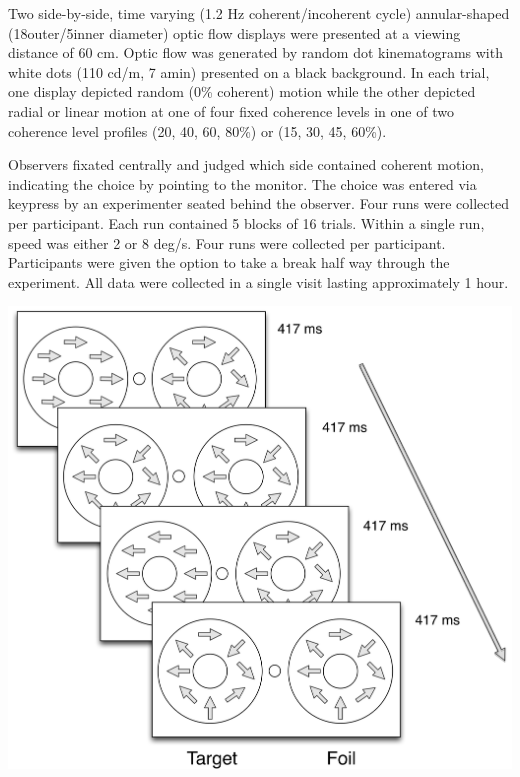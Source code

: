 \documentclass[landscape,final,paperwidth=60in,paperheight=39in,fontscale=0.285]{baposter}
\begin{document}
\begin{poster}
{\begin{center}
\end{center}
\par Two side-by-side, time varying (1.2 Hz coherent/incoherent cycle) annular-shaped (18\degree outer/5\degree inner diameter) optic flow displays were presented at a viewing distance of 60 cm. Optic flow was generated by random dot kinematograms with white dots (110 cd/m, 7 amin) presented on a black background. In each trial, one display depicted random (0\% coherent) motion while the other depicted radial or linear motion at one of four fixed coherence levels in one of two coherence level profiles (20, 40, 60, 80\%) or (15, 30, 45, 60\%).
\par Observers fixated centrally and judged which side contained coherent motion, indicating the choice by pointing to the monitor. The choice was entered via keypress by an experimenter seated behind the observer. Four runs were collected per participant. Each run contained 5 blocks of 16 trials. Within a single run, speed was either 2 or 8 deg/s. Four runs were collected per participant. Participants were given the option to take a break half way through the experiment. All data were collected in a single visit lasting approximately 1 hour.
    }
    {
\begin{center}
\includegraphics[scale=0.4]{img/optic-flow-psychophysics-display.png}

\end{center}}
\end{poster}
\end{document}
